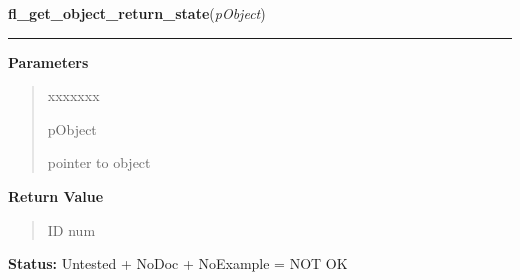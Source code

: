     \label{xformslib:library:fl_get_object_return_state}

    \vspace{0.5ex}

\hspace{.8\funcindent}\begin{boxedminipage}{\funcwidth}

    \raggedright \textbf{fl\_get\_object\_return\_state}(\textit{pObject})

    \vspace{-1.5ex}

    \rule{\textwidth}{0.5\fboxrule}
\setlength{\parskip}{2ex}
\setlength{\parskip}{1ex}
      \textbf{Parameters}
      \vspace{-1ex}

      \begin{quote}
        \begin{Ventry}{xxxxxxx}

          \item[pObject]

          pointer to object

        \end{Ventry}

      \end{quote}

      \textbf{Return Value}
    \vspace{-1ex}

      \begin{quote}
      ID num

      \end{quote}

\textbf{Status:} Untested + NoDoc + NoExample = NOT OK



    \end{boxedminipage}

    \label{xformslib:library:fl_trigger_object}

    \vspace{0.5ex}

